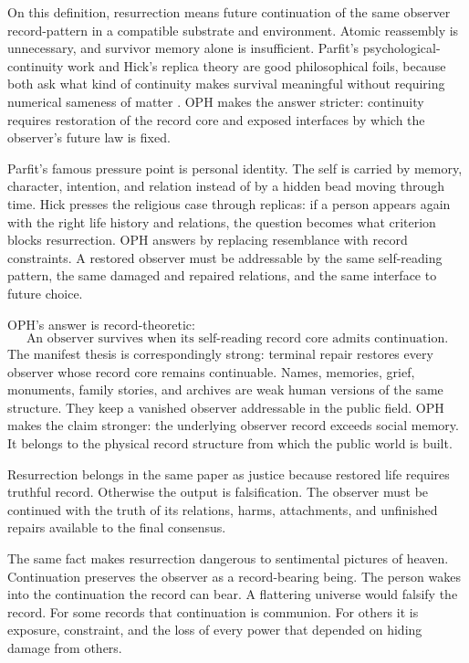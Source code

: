 \documentclass[11pt]{article}
\theoremstyle{remark}
\theoremstyle{plain}
\begin{document}
On this definition, resurrection means future continuation of the same observer
record-pattern in a compatible substrate and environment. Atomic reassembly is
unnecessary, and survivor memory alone is insufficient.
Parfit's psychological-continuity work and Hick's replica theory are good
philosophical foils, because both ask what kind of continuity makes survival
meaningful without requiring numerical sameness of matter
\cite{Parfit1984,Hick1976}. OPH makes the answer stricter: continuity requires
restoration of the record core and exposed interfaces by which the observer's
future law is fixed.

Parfit's famous pressure point is personal identity. The self is carried by
memory, character, intention, and relation instead of by a hidden bead moving
through time. Hick presses the religious case through replicas: if a person
appears again with the right life history and relations, the question becomes
what criterion blocks resurrection. OPH answers by replacing resemblance with
record constraints. A restored observer must be addressable by the same
self-reading pattern, the same damaged and repaired relations, and the same
interface to future choice.

OPH's answer is record-theoretic:
\[
\boxed{
\text{An observer survives when its self-reading record core admits continuation.}
}
\]
The manifest thesis is correspondingly strong: terminal repair restores every
observer whose record core remains continuable.
Names, memories, grief, monuments, family stories, and archives are weak human
versions of the same structure. They keep a vanished observer addressable in
the public field. OPH makes the claim stronger: the underlying observer record
exceeds social memory. It belongs to the physical record structure from which
the public world is built.

Resurrection belongs in the same paper as justice because restored life
requires truthful record. Otherwise the output is falsification. The observer
must be continued with the truth of its relations, harms, attachments, and
unfinished repairs available to the final consensus.

The same fact makes resurrection dangerous to sentimental pictures of heaven.
Continuation preserves the observer as a record-bearing being. The person wakes
into the continuation the record can bear. A flattering universe would falsify
the record. For some records that continuation is
communion. For others it is exposure, constraint, and the loss of every power
that depended on hiding damage from others.
\end{document}
